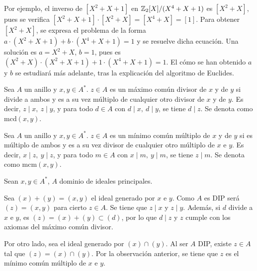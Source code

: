 \begin{obss}
    \item Por ejemplo, el inverso de $[X^2 + X + 1]$ en $\mathbb{Z}_2[X]/(X^4 + X + 1)$ es $[X^2 + X]$, pues se verifica $[X^2 + X + 1]\cdot [X^2 + X] = [X^4 + X] = [1]$. Para obtener $[X^2 + X]$, se expresa el problema de la forma $a\cdot(X^2 + X + 1) + b\cdot(X^4 + X + 1) = 1$ y se resuelve dicha ecuación. Una solución es $a = X^2 + X$, $b = 1$, pues es $(X^2 + X)\cdot(X^2 + X + 1) + 1\cdot(X^4 + X + 1) = 1$. El cómo se han obtenido $a$ y $b$ se estudiará más adelante, tras la explicación del algoritmo de Euclides.
\end{obss}

\medskip

\begin{deff}{\cite[p.~40]{GamboaAnillos}}
    \item Sea $A$ un anillo y $x,y\in A^*$. $z\in A$ es un máximo común divisor de $x$ y de $y$ si divide a ambos y es a su vez múltiplo de cualquier otro divisor de $x$ y de $y$. Es decir, $z\mid x,\ z\mid y$, y para todo $d\in A$ con $d\mid x, \ d\mid y$, se tiene $d\mid z$. Se denota como mcd$(x,y)$.
\end{deff}

\begin{deff}{\cite[p.~40]{GamboaAnillos}}
    \item Sea $A$ un anillo y $x,y\in A^*$. $z\in A$ es un mínimo común múltiplo de $x$ y de $y$ si es múltiplo de ambos y es a su vez divisor de cualquier otro múltiplo de $x$ e $y$. Es decir, $x\mid z,\ y\mid z$, y para todo $m\in A$ con $x\mid m, \ y\mid m$, se tiene $z\mid m$. Se denota como mcm$(x,y)$.
\end{deff}



\begin{prop}\end{prop}

\begin{dem}{\cite[p.~41]{GamboaAnillos}}
    Sean $x,y \in A^*$, $A$ dominio de ideales principales.
        \item Sea $ (x) + (y) =(x,y)$ el ideal generado por $x$ e $y$. Como $A$ es DIP será $(z) = (x,y)$ para cierto $z\in A$. Se tiene que $z\mid x$ y $z\mid y$. Además, si $d$ divide a $x$ e $y$, es $(z) = (x) + (y)  \subset (d)$, por lo que $d\mid z$ y $z$ cumple con los axiomas del máximo común divisor.

        \item Por otro lado, sea el ideal generado por $(x) \cap (y)$. Al ser $A$ DIP, existe $z\in A$ tal que $(z) = (x) \cap (y)$. Por la observación anterior, se tiene que $z$ es el mínimo común múltiplo de $x$ e $y$. 
\end{dem}

